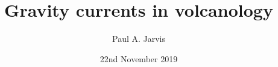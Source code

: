 \documentclass{beamer}
\title[Modeling volcanic processes]{Gravity currents in volcanology} %
\author[Paul Jarvis]{Paul A. Jarvis} %
\institute[UNIGE] %
{
\textit{paul.jarvis@unige.ch} %
}
\date{22nd November 2019} %
\begin{document}
\begin{frame}
\titlepage %
\end{frame}





\end{document}
